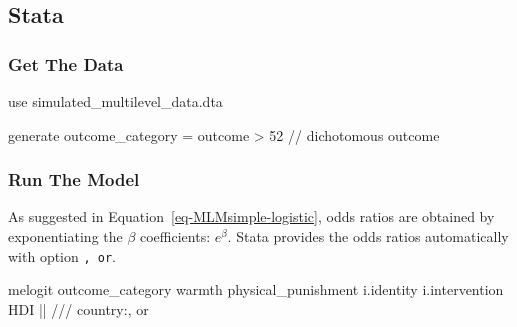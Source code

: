 \documentclass[
  letterpaper,
  DIV=11,
  numbers=noendperiod]{scrreprt}
\newenvironment{Shaded}{\begin{snugshade}}{\end{snugshade}}
\newcommand{\CommentTok}[1]{\textcolor[rgb]{0.37,0.37,0.37}{#1}}
\newcommand{\KeywordTok}[1]{\textcolor[rgb]{0.00,0.23,0.31}{#1}}
\newcommand{\NormalTok}[1]{\textcolor[rgb]{0.00,0.23,0.31}{#1}}
\begin{document}
\subsection{Stata}

\subsubsection{Get The Data}\label{get-the-data-6}

\begin{Shaded}
\begin{Highlighting}[]

\KeywordTok{use}\NormalTok{ simulated\_multilevel\_data.dta}

\KeywordTok{generate}\NormalTok{ outcome\_category = outcome \textgreater{} 52 }\CommentTok{// dichotomous outcome}
\end{Highlighting}
\end{Shaded}

\subsubsection{Run The Model}\label{run-the-model-3}

As suggested in Equation~\ref{eq-MLMsimple-logistic}, odds ratios are
obtained by exponentiating the \(\beta\) coefficients: \(e^{\beta}\).
Stata provides the odds ratios automatically with option \texttt{,\ or}.

\begin{Shaded}
\begin{Highlighting}[]
\NormalTok{melogit outcome\_category warmth physical\_punishment i.}\KeywordTok{identity}\NormalTok{ i.intervention HDI || }\CommentTok{/// }
\NormalTok{country:, }\KeywordTok{or}
\end{Highlighting}
\end{Shaded}
\end{document}
